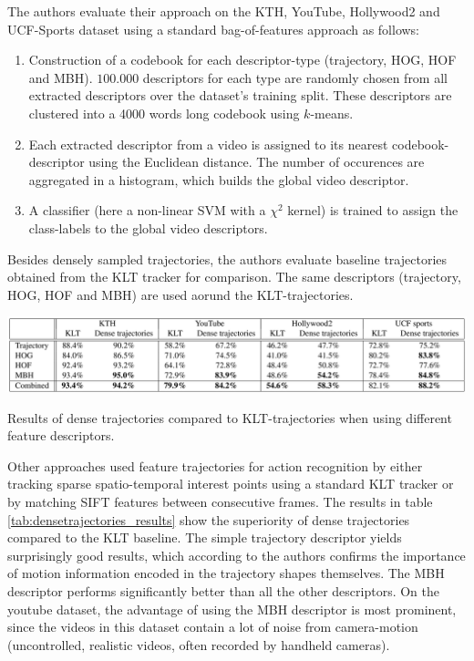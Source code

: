 The authors evaluate their approach on the KTH, YouTube, Hollywood2 and UCF-Sports dataset using a standard bag-of-features approach as follows:

\begin{enumerate}
    \item Construction of a codebook for each descriptor-type (trajectory, HOG, HOF and MBH).
        $100.000$ descriptors for each type are randomly chosen from all extracted descriptors over the dataset's training split.
        These descriptors are clustered into a 4000 words long codebook using $k$-means.
    \item Each extracted descriptor from a video is assigned to its nearest codebook-descriptor using the Euclidean distance.
        The number of occurences are aggregated in a histogram, which builds the global video descriptor.
    \item A classifier (here a non-linear SVM with a $\chi^2$ kernel) is trained to assign the class-labels to the global video descriptors.
\end{enumerate}

Besides densely sampled trajectories, the authors evaluate baseline trajectories obtained from the KLT tracker for comparison.
The same descriptors (trajectory, HOG, HOF and MBH) are used aorund the KLT-trajectories.

\begin{table}[H]
    \centering
    \includegraphics[width=\textwidth]{img_conventional/densetrajectories_results}
    \caption{Results of dense trajectories compared to KLT-trajectories when using different feature descriptors. \cite{wang_action_2011}}
    \label{tab:densetrajectories_results}
\end{table}

Other approaches used feature trajectories for action recognition by either tracking sparse spatio-temporal interest points using a standard KLT tracker \cite{lucas_iterative_1981} or by matching SIFT features \cite{lowe_distinctive_2004} between consecutive frames.
The results in table \ref{tab:densetrajectories_results} show the superiority of dense trajectories compared to the KLT baseline.
The simple trajectory descriptor yields surprisingly good results, which according to the authors confirms the importance of motion information encoded in the trajectory shapes themselves.
The MBH descriptor performs significantly better than all the other descriptors.
On the youtube dataset, the advantage of using the MBH descriptor is most prominent, since the videos in this dataset contain a lot of noise from camera-motion (uncontrolled, realistic videos, often recorded by handheld cameras).


